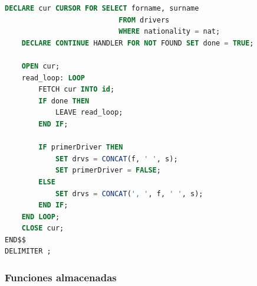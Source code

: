 \documentclass{db-practice}
\begin{document}
\begin{enumerate}
\begin{lstlisting}[language=SQL]
    DECLARE cur CURSOR FOR SELECT forname, surname 
                           FROM drivers
                           WHERE nationality = nat;
    DECLARE CONTINUE HANDLER FOR NOT FOUND SET done = TRUE;
    
    OPEN cur;
    read_loop: LOOP
        FETCH cur INTO id;
        IF done THEN
            LEAVE read_loop;
        END IF;
        
        IF primerDriver THEN
            SET drvs = CONCAT(f, ' ', s);
            SET primerDriver = FALSE;
        ELSE
            SET drvs = CONCAT(', ', f, ' ', s);
        END IF;
    END LOOP;
    CLOSE cur;
END$$
DELIMITER ;
\end{lstlisting}

\end{enumerate}

\subsubsection*{Funciones almacenadas}
\end{document}
